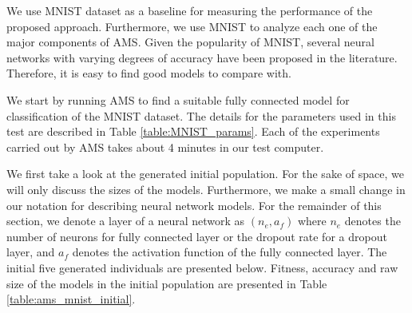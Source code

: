 \documentclass[preprint,12pt]{elsarticle}%
\begin{document}
We use MNIST dataset as a baseline for measuring the performance of the proposed approach. Furthermore, we use MNIST to analyze each one of the major components of AMS. Given the popularity of MNIST, several neural networks with varying degrees of accuracy have been proposed in the literature. Therefore, it is easy to find good models to compare with. 

We start by running AMS to find a suitable fully connected model for classification of the MNIST dataset. The details for the parameters used in this test are described in Table \ref{table:MNIST_params}. Each of the experiments carried out by AMS takes about 4 minutes in our test computer. 

\begin{table}[H]
\begin{center}
\end{center}
\caption{AMS Parameters for MNIST dataset.}
\label{table:MNIST_params}
\end{table}

We first take a look at the generated initial population. For the sake of space, we will only discuss the sizes of the models. Furthermore, we make a small change in our notation for describing neural network models. For the remainder of this section, we denote a layer of a neural network as $(n_e, a_f)$ where $n_e$ denotes the number of neurons for fully connected layer or the dropout rate for a dropout layer, and $a_f$ denotes the activation function of the fully connected layer. The initial five generated individuals are presented below. Fitness, accuracy and raw size of the models in the initial population are presented in Table \ref{table:ams_mnist_initial}.
\end{document}
